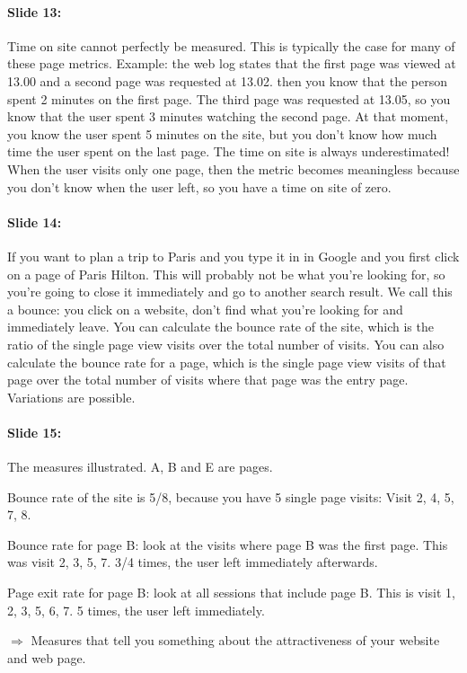 \documentclass[10pt,a4paper]{report}
\begin{document}
\paragraph{Slide 13:}Time on site cannot perfectly be measured. This is typically the case for many of these page metrics. Example: the web log states that the first page was viewed at 13.00 and a second page was requested at 13.02. then you know that the person spent 2 minutes on the first page. The third page was requested at 13.05, so you know that the user spent 3 minutes watching the second page. At that moment, you know the user spent 5 minutes on the site, but you don't know how much time the user spent on the last page. The time on site is always underestimated! When the user visits only one page, then the metric becomes meaningless because you don't know when the user left, so you have a time on site of zero.

\paragraph{Slide 14:}If you want to plan a trip to Paris and you type it in in Google and you first click on a page of Paris Hilton. This will probably not be what you're looking for, so you're going to close it immediately and go to another search result. We call this a bounce: you click on a website, don't find what you're looking for and immediately leave. You can calculate the bounce rate of the site, which is the ratio of the single page view visits over the total number of visits. You can also calculate the bounce rate for a page, which is the single page view visits of that page over the total number of visits where that page was the entry page.
Variations are possible.

\paragraph{Slide 15:}The measures illustrated. A, B and E are pages.
\begin{description}
\item Bounce rate of the site is 5/8, because you have 5 single page visits: Visit 2, 4, 5, 7, 8.
\item Bounce rate for page B: look at the visits where page B was the first page. This was visit 2, 3, 5, 7. 3/4 times, the user left immediately afterwards.
\item Page exit rate for page B: look at all sessions that include page B. This is visit 1, 2, 3, 5, 6, 7. 5 times, the user left immediately.
\end{description} 
$\Rightarrow$ Measures that tell you something about the attractiveness of your website and web page.
\end{document}
